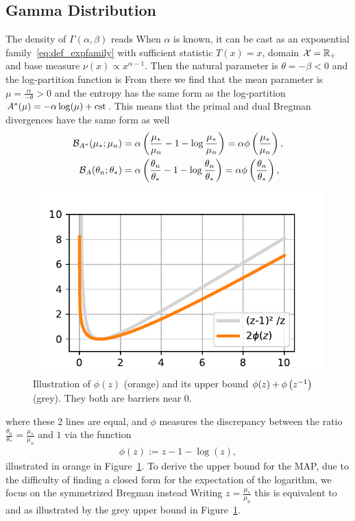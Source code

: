 \documentclass[twoside]{article}
\newcommand{\logpart}{A}
\newcommand{\conj}{{\logpart^*}}
\newcommand{\bregman}{\cB_\logpart}
\newcommand{\bregmanconj}{\cB_{\logpart^*}}
\newcommand{\nat}{\theta}
\newcommand{\m}{\mu}
\begin{document}
\subsection{Gamma Distribution}
\label{app:gamma}
The density of $\Gamma(\alpha,\beta)$ reads
When $\alpha$ is known, it can be cast as an exponential family~\eqref{eq:def_expfamily} with sufficient statistic $T(x)=x$, domain ${\mathcal X} = \mathbb{R}_+$ and base measure $\nu(x)\propto x^{\alpha-1}$. Then the natural parameter is $\nat = -\beta < 0$ and the log-partition function is
\alignn{
	\logpart (\nat) = -\alpha \log(-\nat)  + \log\Gamma(\alpha) \; .
}
From there we find that the mean parameter is $\mu = \frac{\alpha}{-\nat} >0$ and the entropy has the same form as the log-partition $\conj(\mu) = - \alpha \log(\mu) + \cst$.
This means that the primal and dual Bregman divergences have the same form as well
\begin{align}
	\bregmanconj(\m_*; \m_n) 
	&= \alpha \left ( \frac{\m_*}{ \m_n} - 1 - \log  \frac{\m_*}{ \m_n} \right) 
	= \alpha \phi\paren{\frac{\m_*}{ \m_n}},
	\\
	\bregman( \nat_n; \nat_* ) 
	&=  \alpha \left ( \frac{ \nat_n}{\nat_*} - 1 - \log  \frac{ \nat_n}{\nat_*} \right)
	= \alpha \phi\paren{\frac{ \nat_n}{\nat_*}},
\end{align}
\begin{figure}
	\centering
	\includegraphics[width=.38\textwidth]{phi.pdf}
	\caption{%
	Illustration of $\phi(z)$ (orange) and its upper bound $\phi(z) + \phi\left(z^{-1}\right)$ (grey).
	They both are barriers near $0$.
	}
	\label{fig:phi}
\end{figure}
where these 2 lines are equal, and $\phi$ measures the discrepancy between the ratio $\frac{ \nat_n}{\nat_*} =  \frac{\m_*}{ \m_n}  $ and $1$ via the function
\begin{align}
	\phi(z) := z - 1 - \log(z),
\end{align}
illustrated in orange in Figure~\ref{fig:phi}.
To derive the upper bound for the MAP, due to the difficulty of finding a closed form for the expectation of the logarithm, we focus on the symmetrized Bregman instead
\alignn{
	\bregmanconj( \mu_*; \mu_n) 
	\leq \cS_{\conj} (\mu_*, \mu_n )
	&:= \bregmanconj( \mu_*; \mu_n)  + \bregmanconj( \mu_n; \mu_*) \nonumber\\
	&=  \alpha \paren{\frac{ \mu_*}{\mu_n} -1 +\frac{ \mu_n}{\mu_*} - 1 },
	\label{eq:symmetrized_bregman} \\
	&= \alpha\phi\paren{\frac{\mu_*}{\mu_n}} + \alpha\phi\paren{\frac{\mu_n}{\mu_*}}
}
Writing $z=\frac{\mu_*}{\mu_n}$ this is equivalent to
and as illustrated by the grey upper bound in Figure~\ref{fig:phi}.
\end{document}
